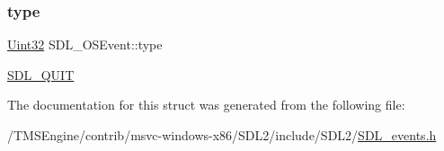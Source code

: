 \subsubsection{\texorpdfstring{type}{type}}
{\footnotesize\ttfamily \hyperlink{_s_d_l__stdinc_8h_add440eff171ea5f55cb00c4a9ab8672d}{Uint32} S\+D\+L\+\_\+\+O\+S\+Event\+::type}

\hyperlink{_s_d_l__events_8h_a3b589e89be6b35c02e0dd34a55f3fccaa31acc5fdafc86ebe2c1f5c3cae48d603}{S\+D\+L\+\_\+\+Q\+U\+IT} 

The documentation for this struct was generated from the following file\+:\begin{DoxyCompactItemize}
\item 
/\+T\+M\+S\+Engine/contrib/msvc-\/windows-\/x86/\+S\+D\+L2/include/\+S\+D\+L2/\hyperlink{_s_d_l__events_8h}{S\+D\+L\+\_\+events.\+h}\end{DoxyCompactItemize}
